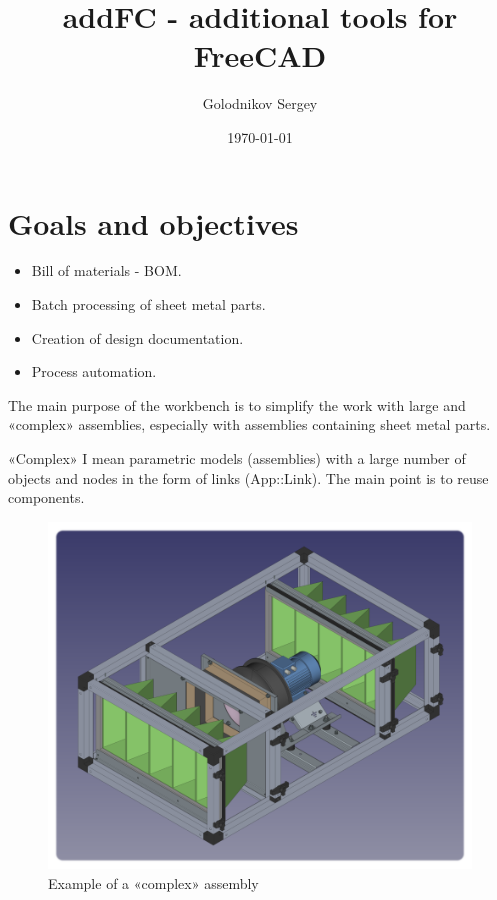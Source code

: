 \documentclass[a4paper,12pt]{article}
\title{addFC - additional tools for FreeCAD}
\author{Golodnikov Sergey}
\date{\today}
\begin{document}
\maketitle


\section{Goals and objectives}
\begin{itemize}
	\item Bill of materials - BOM.
	\item Batch processing of sheet metal parts.
	\item Creation of design documentation.
	\item Process automation.\\
\end{itemize}

The main purpose of the workbench is to simplify the work with large and «complex» assemblies, especially with assemblies containing sheet metal parts.

«Complex» I mean parametric models (assemblies) with a large number of objects and nodes in the form of links (App::Link). The main point is to reuse components.

\begin{figure}[htp]
\centering
\includegraphics[scale=12.00]{img/assembly_example.png}
\caption{Example of a «complex» assembly}
\label{sec:assembly_example}
\end{figure}
\end{document}
